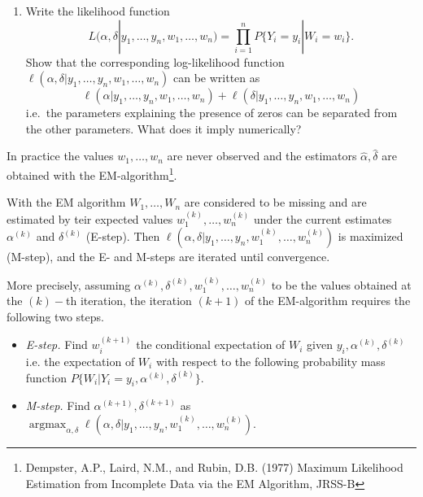 \documentclass[a4paper,12pt]{article}
\DeclareMathOperator*{\argmax}{argmax}
\begin{document}
\begin{enumerate}
  \item[a)] Write the likelihood function $$L(\alpha, \delta |y_1, \ldots, y_n,
w_1, \ldots, w_n)=\prod_{i=1}^n P\{Y_i=y_i|W_i=w_i\}.$$ 
Show that the
corresponding log-likelihood function $\ell(\alpha, \delta |y_1, \ldots,
y_n, w_1, \ldots, w_n)$ can be written as $$\ell(\alpha |y_1, \ldots, y_n,
w_1, \ldots, w_n)+\ell(\delta |y_1, \ldots, y_n, w_1, \ldots, w_n)$$ i.e.\ the
parameters explaining the presence of zeros can be separated from the other
parameters. What does it imply numerically?
\end{enumerate}
In practice the values $w_1, \ldots, w_n$ are never observed and the
estimators $\hat{\alpha}, \hat{\delta}$ are obtained with the EM-algorithm\footnote{Dempster, A.P., Laird, N.M., and Rubin, D.B. (1977) Maximum Likelihood
Estimation from Incomplete Data via the EM Algorithm, JRSS-B}.

With the EM algorithm $W_1, \ldots, W_n$ are considered to be missing and are 
estimated
by teir expected values $w_1^{(k)}, \ldots, w_n^{(k)}$ under the current
estimates $\alpha^{(k)}$ and $\delta^{(k)}$ (E-step). Then
$\ell(\alpha, \delta |y_1, \ldots, y_n, w_1^{(k)}, \ldots, w_n^{(k)})$ is 
maximized (M-step), and the E- and M-steps are iterated until convergence.

More precisely, assuming $\alpha^{(k)}, \delta^{(k)}, w_1^{(k)}, \ldots,
w_n^{(k)}$ to be the values obtained at the $(k)-$th iteration, the iteration 
$(k+1)$
of the EM-algorithm requires the following two steps.
\begin{itemize}
  \item \textit{E-step.}  Find $w_i^{(k+1)}$ the conditional expectation of
$W_i$ given $y_i,  \alpha^{(k)}, \delta^{(k)}$ i.e. the expectation of $W_i$
with respect to the following probability mass function $P\{W_i|Y_i=y_i,
\alpha^{(k)}, \delta^{(k)}\}$.
  \item \textit{M-step.}  Find $\alpha^{(k+1)}, \delta^{(k+1)}$ as
$\argmax_{\alpha, \delta} \ell(\alpha, \delta |y_1, \ldots, y_n, w_1^{(k)},
\ldots, w_n^{(k)})$.
\end{itemize}
\end{document}
